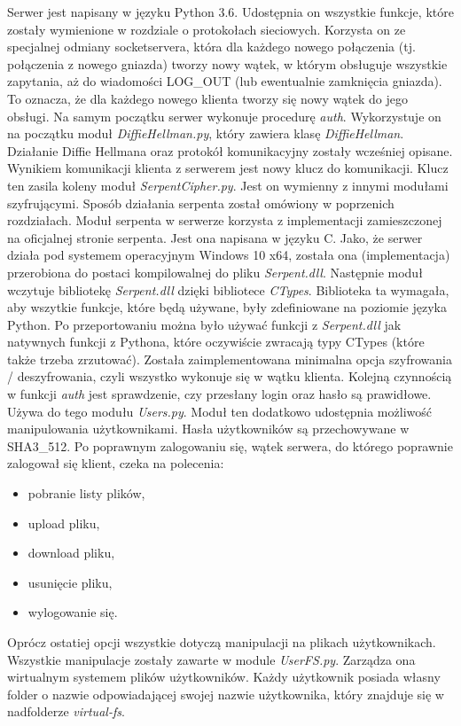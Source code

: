 \documentclass{article}
\begin{document}
	Serwer jest napisany w języku Python 3.6. Udostępnia on wszystkie funkcje, które zostały wymienione w rozdziale o protokołach sieciowych. Korzysta on ze specjalnej odmiany socketservera, która dla każdego nowego połączenia (tj. połączenia z nowego gniazda) tworzy nowy wątek, w którym obsługuje wszystkie zapytania, aż do wiadomości LOG_OUT (lub ewentualnie zamknięcia gniazda). To oznacza, że dla każdego nowego klienta tworzy się nowy wątek do jego obsługi. Na samym początku serwer wykonuje procedurę \textit{auth}. Wykorzystuje on na początku moduł \textit{DiffieHellman.py}, który zawiera klasę \textit{DiffieHellman}. Działanie Diffie Hellmana oraz protokół komunikacyjny zostały wcześniej opisane. Wynikiem komunikacji klienta z serwerem jest nowy klucz do komunikacji. Klucz ten zasila koleny moduł \textit{SerpentCipher.py}. Jest on wymienny z innymi modułami szyfrującymi. Sposób działania serpenta został omówiony w poprzenich rozdziałach. Moduł serpenta w serwerze korzysta z implementacji zamieszczonej na oficjalnej stronie serpenta. Jest ona napisana w języku C. Jako, że serwer działa pod systemem operacyjnym Windows 10 x64, została ona (implementacja) przerobiona do postaci kompilowalnej do pliku \textit{Serpent.dll}. Następnie moduł wczytuje bibliotekę \textit{Serpent.dll} dzięki bibliotece \textit{CTypes}. Biblioteka ta wymagała, aby wszytkie funkcje, które będą używane, były zdefiniowane na poziomie języka Python. Po przeportowaniu można było używać funkcji z \textit{Serpent.dll} jak natywnych funkcji z Pythona, które oczywiście zwracają typy CTypes (które także trzeba zrzutować). Została zaimplementowana minimalna opcja szyfrowania / deszyfrowania, czyli wszystko wykonuje się w wątku klienta.
	Kolejną czynnością w funkcji \textit{auth} jest sprawdzenie, czy przesłany login oraz hasło są prawidłowe. Używa do tego modułu \textit{Users.py}. Moduł ten dodatkowo udostępnia możliwość manipulowania użytkownikami. Hasła użytkowników są przechowywane w SHA3_512. Po poprawnym zalogowaniu się, wątek serwera, do którego poprawnie zalogował się klient, czeka na polecenia:
	\begin{itemize}
		\item pobranie listy plików,
		\item upload pliku,
		\item download pliku,
		\item usunięcie pliku,
		\item wylogowanie się.
	\end{itemize}

	Oprócz ostatiej opcji wszystkie dotyczą manipulacji na plikach użytkownikach. Wszystkie manipulacje zostały zawarte w module \textit{UserFS.py}. Zarządza ona wirtualnym systemem plików użytkowników. Każdy użytkownik posiada własny folder o nazwie odpowiadającej swojej nazwie użytkownika, który znajduje się w nadfolderze \textit{virtual-fs}. 
\end{document}
